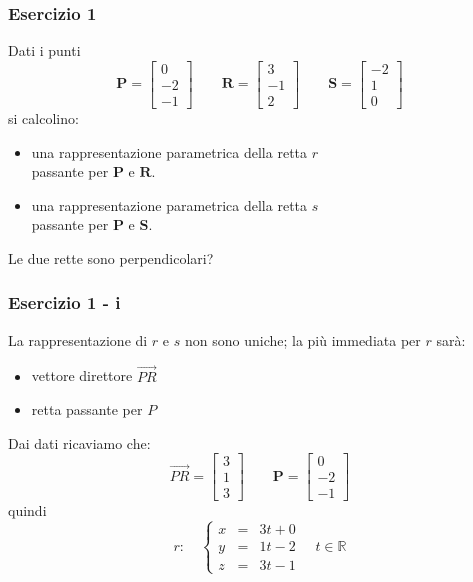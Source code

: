 \documentclass{beamer}
\begin{document}
\begin{frame}
\frametitle{Esercizio 1}
Dati i punti
$$
\mathbf{P}=\left[
\begin{array}{c}
0\\
-2\\
-1
\end{array}
\right]
\qquad
\mathbf{R}=\left[
\begin{array}{c}
3\\
-1\\
2
\end{array}
\right] \qquad
\mathbf{S}=\left[
\begin{array}{c}
-2\\
1\\
0
\end{array}
\right] 
$$
si calcolino:
    \begin{itemize}
    \item una rappresentazione parametrica della retta $r$ \\ passante per $\mathbf{P}$ e $\mathbf{R}$.
    \item una rappresentazione parametrica della retta $s$ \\ passante per $\mathbf{P}$ e $\mathbf{S}$.
    \end{itemize}
    
Le due rette sono perpendicolari?
\end{frame}

\begin{frame}
\frametitle{Esercizio 1 - i}

La rappresentazione di $r$ e $s$ non sono uniche; la pi\`u immediata per $r$ sar\`a:
\begin{itemize}
        \item vettore direttore $\overrightarrow{PR}$
        \item retta passante per $P$
\end{itemize}
Dai dati ricaviamo che:
$$
\overrightarrow{PR} = \left[
\begin{array}{c}
3\\
1\\
3
\end{array}
\right]
\qquad
\mathbf P = \left[
\begin{array}{c}
0\\
-2\\
-1
\end{array}
\right]
$$
quindi 
$$r: \quad \left\{
\begin{array}{rcl}
x&=&3t+0\\
y&=&1t-2\\
z&=&3t-1
\end{array}
\right. \quad t\in \mathbb{R}
$$
\end{frame}
\end{document}

